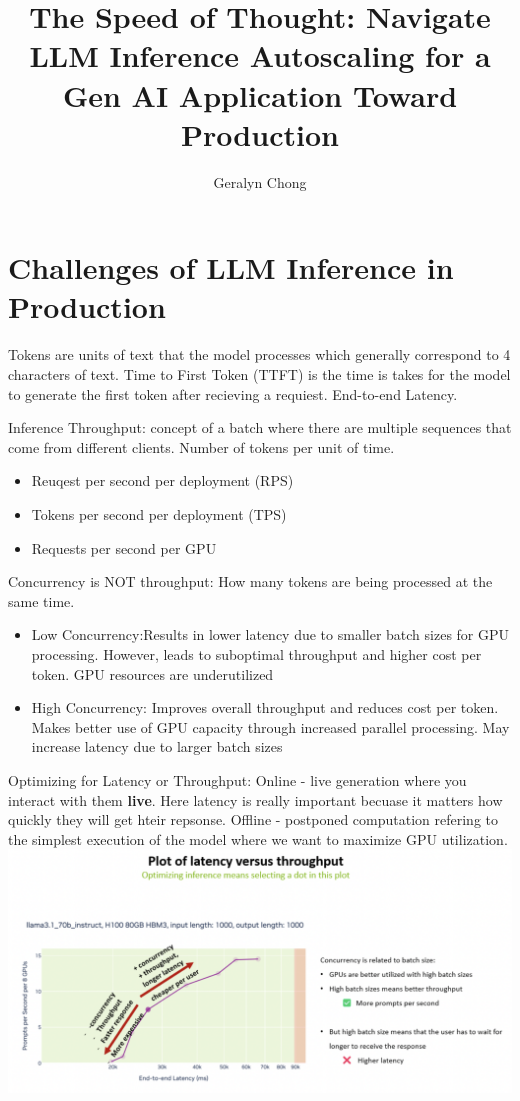 \documentclass{article}
\title{The Speed of Thought: Navigate LLM Inference Autoscaling for a Gen AI Application Toward Production}
\author{Geralyn Chong}
\begin{document}
\maketitle
\tableofcontents

\section{Challenges of LLM Inference in Production}
Tokens are units of text that the model processes which generally correspond to 4 characters of text. Time to First Token (TTFT) is the time is takes for the model to generate the first token after recieving a requiest. End-to-end Latency. 

Inference Throughput: concept of a batch where there are multiple sequences that come from different clients. Number of tokens per unit of time. 
\begin{itemize}
    \item Reuqest per second per deployment (RPS)
    \item Tokens per second per deployment (TPS)
    \item Requests per second per GPU
\end{itemize}
Concurrency is NOT throughput: How many tokens are being processed at the same time. \begin{itemize}
    \item Low Concurrency:Results in lower latency due to smaller batch sizes for GPU processing. However, leads to suboptimal throughput and higher cost per token. GPU resources are underutilized
    \item High Concurrency: Improves overall throughput and reduces cost per token. Makes better use of GPU capacity through increased parallel processing. May increase latency due to larger batch sizes
\end{itemize}
Optimizing for Latency or Throughput: 
Online - live generation where you interact with them \textbf{live}. Here latency is really important becuase it matters how quickly they will get hteir repsonse.
Offline - postponed computation refering to the simplest execution of the model where we want to maximize GPU utilization. \\\includegraphics[width=\textwidth]{../images/latencyPlot.png}\\
\end{document}
